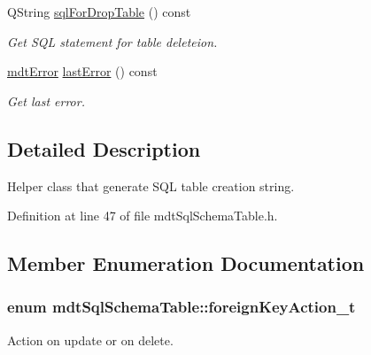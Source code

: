 \begin{DoxyCompactItemize}
Q\-String \hyperlink{classmdt_sql_schema_table_a35fd4ed657f48013747973fef78be345}{sql\-For\-Drop\-Table} () const 
\begin{DoxyCompactList}\small\item\em Get S\-Q\-L statement for table deleteion. \end{DoxyCompactList}\item 
\hyperlink{classmdt_error}{mdt\-Error} \hyperlink{classmdt_sql_schema_table_a8199d144499e7fd77ad168049a3c2ca7}{last\-Error} () const 
\begin{DoxyCompactList}\small\item\em Get last error. \end{DoxyCompactList}\end{DoxyCompactItemize}


\subsection{Detailed Description}
Helper class that generate S\-Q\-L table creation string. 

Definition at line 47 of file mdt\-Sql\-Schema\-Table.\-h.



\subsection{Member Enumeration Documentation}
\hypertarget{classmdt_sql_schema_table_a1738e443f03dc69b914edb967cb911be}{
\subsubsection[{foreign\-Key\-Action\-\_\-t}]{\setlength{\rightskip}{0pt plus 5cm}enum {\bf mdt\-Sql\-Schema\-Table\-::foreign\-Key\-Action\-\_\-t}}}\label{classmdt_sql_schema_table_a1738e443f03dc69b914edb967cb911be}


Action on update or on delete. 

